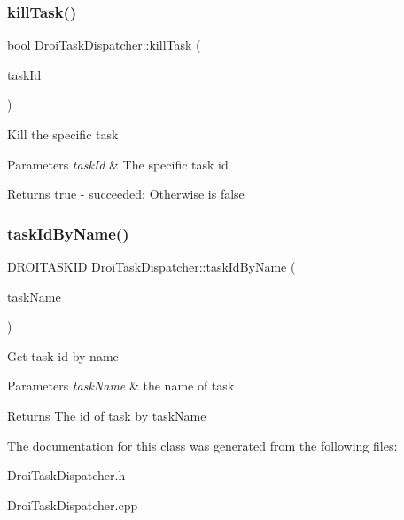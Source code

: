 \mbox{\label{class_droi_task_dispatcher_a00ead6235c3452e2fe41e1f2ebac9a5b}} 
\subsubsection{\texorpdfstring{kill\+Task()}{killTask()}}
{\footnotesize\ttfamily bool Droi\+Task\+Dispatcher\+::kill\+Task (\begin{DoxyParamCaption}\item[{D\+R\+O\+I\+T\+A\+S\+K\+ID}]{task\+Id }\end{DoxyParamCaption})}

Kill the specific task 
\begin{DoxyParams}{Parameters}
{\em task\+Id} & The specific task id \\
\hline
\end{DoxyParams}
\begin{DoxyReturn}{Returns}
true -\/ succeeded; Otherwise is false 
\end{DoxyReturn}
\mbox{\label{class_droi_task_dispatcher_aa535e2418acecf3b6f26772f3b1a0091}} 
\subsubsection{\texorpdfstring{task\+Id\+By\+Name()}{taskIdByName()}}
{\footnotesize\ttfamily D\+R\+O\+I\+T\+A\+S\+K\+ID Droi\+Task\+Dispatcher\+::task\+Id\+By\+Name (\begin{DoxyParamCaption}\item[{const std\+::string \&}]{task\+Name }\end{DoxyParamCaption})\hspace{0.3cm}{\ttfamily [static]}}

Get task id by name 
\begin{DoxyParams}{Parameters}
{\em task\+Name} & the name of task \\
\hline
\end{DoxyParams}
\begin{DoxyReturn}{Returns}
The id of task by task\+Name 
\end{DoxyReturn}


The documentation for this class was generated from the following files\+:\begin{DoxyCompactItemize}
\item 
Droi\+Task\+Dispatcher.\+h\item 
Droi\+Task\+Dispatcher.\+cpp\end{DoxyCompactItemize}
